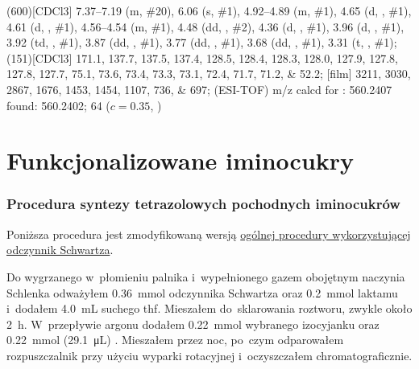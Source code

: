 \begin{fullexp}
	\NMR(600)[CDCl3] \numrange{7.37}{7.19} (m, \#{20}), \num{6.06} (s, \#{1}), \numrange{4.92}{4.89} (m, \#{1}), \num{4.65} (d, , \#{1}), \num{4.61} (d, , \#{1}), \numrange{4.56}{4.54} (m, \#{1}), \num{4.48} (dd, , \#{2}), \num{4.36} (d, , \#{1}), \num{3.96} (d, , \#{1}), \num{3.92} (td, , \#{1}), \num{3.87} (dd, , \#{1}), \num{3.77} (dd, , \#{1}), \num{3.68} (dd, , \#{1}), \num{3.31} (t, , \#{1}); 
	(151)[CDCl3] \numlist{171.1; 137.7; 137.5; 137.4; 128.5; 128.4; 128.3; 128.0; 127.9; 127.8; 127.8; 127.7; 75.1; 73.6; 73.4; 73.3; 73.1; 72.4; 71.7; 71.2; 52.2}; 
	[film] \numlist{3211; 3030; 2867; 1676; 1453; 1454; 1107; 736; 697}; 
	 (ESI-TOF) m/z calcd for : \num{560.2407} found: \num{560.2402};
	\data{[$\alpha^{23}_D$]~$=$} \num{64} ($c = 0.35$, )
\end{fullexp}


\section{Funkcjonalizowane iminocukry}\label{experimental:iminosugars}
\subsubsection{Procedura syntezy tetrazolowych pochodnych iminocukrów}\label{experimental:sugars:schwartz}
Poniższa procedura jest zmodyfikowaną wersją \hyperref[experimental:activation:schwartz]{%
	ogólnej procedury wykorzystującej odczynnik Schwartza}.

Do wygrzanego w~płomieniu palnika i~wypełnionego gazem obojętnym naczynia Schlenka odważyłem
\SI{0.36}{\mmol} odczynnika Schwartza oraz \SI{0.2}{\mmol} laktamu i~dodałem \SI{4.0}{\mL} suchego \gls{thf}.
Mieszałem do~sklarowania roztworu, zwykle około \SI{2}{\hour}.
W~przepływie argonu dodałem \SI{0.22}{\mmol} wybranego izocyjanku oraz \SI{0.22}{\mmol} (\SI{29.1}{\micro\liter}) .
Mieszałem przez noc, po~czym odparowałem rozpuszczalnik przy użyciu wyparki rotacyjnej
	i~oczyszczałem chromatograficznie.

